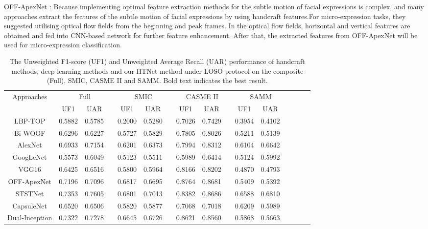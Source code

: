 \documentclass[review,12pt, 3p]{elsarticle}
\begin{document}
OFF-ApexNet \cite{ref-9}: Because implementing optimal feature extraction methods for the subtle motion of facial expressions is complex, and many approaches extract the features of the subtle motion of facial expressions by using handcraft features.For micro-expression tasks, they suggested utilising optical flow fields from the beginning and peak frames. In the optical flow fields, horizontal and vertical features are obtained and fed into CNN-based network for further feature enhancement. After that, the extracted features from OFF-ApexNet will be used for micro-expression classification. 
\begin{table*}[!t]
\centering
\scriptsize
\caption{ The Unweighted F1-score (UF1) and Unweighted Average Recall (UAR) performance of handcraft methods, deep learning methods and our HTNet method under LOSO protocol on the composite (Full), SMIC, CASME II and SAMM. Bold text indicates the best result.}
\begin{tabular}{c c c c c c c c c c c c c c c  c }
\hline
 \multirow{2}{*}{Approaches} &\multicolumn{3}{c}{Full} &\multicolumn{3}{c}{SMIC}&\multicolumn{3}{c}{CASME II}&\multicolumn{3}{c}{SAMM}\\
\cline{2-3} \cline{5-6} \cline{8-9} \cline{11-12}
 &UF1 &UAR& &UF1 &UAR &  &UF1 &UAR &  &UF1 &UAR& \\
\hline
LBP-TOP \cite{ref-23} &0.5882 &0.5785& &0.2000 &0.5280 &  &0.7026 &0.7429 &  &0.3954 &0.4102 &\\
Bi-WOOF \cite{ref-24}&0.6296 &0.6227& &0.5727 &0.5829 &  &0.7805 &0.8026 &  &0.5211 &0.5139& \\
\hline
AlexNet \cite{ref-11} &0.6933 & 0.7154 & &0.6201& 0.6373 & &0.7994 & 0.8312 & &0.6104  &0.6642& \\
GoogLeNet \cite{ref-13}    &0.5573& 0.6049& & 0.5123& 0.5511& & 0.5989 & 0.6414 & &0.5124 & 0.5992& \\
VGG16 \cite{ref-14}          &0.6425 &0.6516 & & 0.5800 &0.5964 & &0.8166 & 0.8202  & &0.4870 & 0.4793& \\
OFF-ApexNet \cite{ref-9}&0.7196 & 0.7096 & & 0.6817 & 0.6695 & & 0.8764 & 0.8681& & 0.5409 &0.5392& \\
STSTNet \cite{ref-5}     &0.7353  & 0.7605  & &0.6801& 0.7013 & &0.8382 & 0.8686& & 0.6588 &0.6810& \\
CapsuleNet \cite{ref-43} &0.6520 & 0.6506 & & 0.5820 & 0.5877 & & 0.7068 &0.7018 & & 0.6209& 0.5989& \\
Dual-Inception \cite{ref-44}&0.7322 &0.7278& & 0.6645 & 0.6726 & & 0.8621 & 0.8560 & &0.5868 & 0.5663& \\

\end{tabular}
\end{table*}
\end{document}

